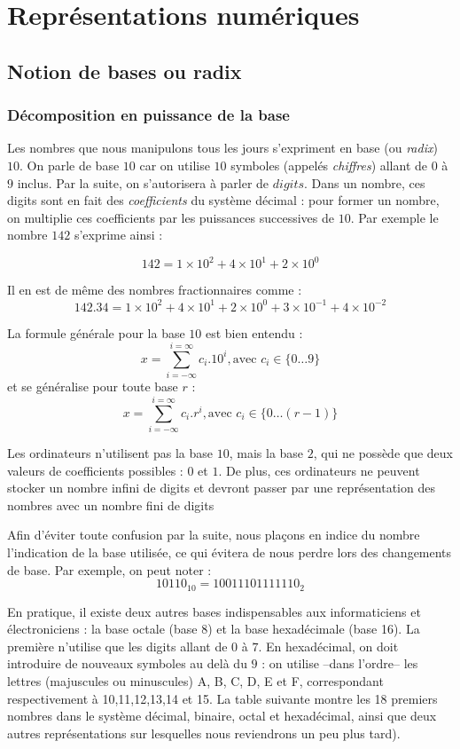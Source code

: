 \chapter{Représentations numériques}

\minitoc

\section{Notion de bases ou radix}

\subsection{Décomposition en puissance de la base}
Les nombres que nous manipulons tous les jours s'expriment en base (ou {\it radix}) $10$.
On parle de base $10$ car on utilise $10$ symboles (appelés {\it chiffres}) allant de $0$ à $9$ inclus.
Par la suite, on s'autorisera à parler de $digits$.
Dans un nombre, ces digits sont en fait des {\it coefficients} du système décimal :
pour former un nombre, on multiplie ces coefficients par les puissances successives de $10$.
Par exemple le nombre $142$ s'exprime ainsi :

$$ 142 = 1\times 10^2 + 4\times 10^1 + 2\times 10^0$$

Il en est de même des nombres fractionnaires comme :
$$ 142.34 = 1\times 10^2 + 4\times 10^1 + 2\times 10^0 + 3\times 10^{-1} + 4\times 10^{-2}$$

La formule générale pour la base $10$ est bien entendu :
$$ x = \sum_{i=-\infty}^{i=\infty} c_i.10^i, \mbox{avec } c_i \in \{0\dots 9\}$$
et se généralise pour toute base $r$ :
$$ x = \sum_{i=-\infty}^{i=\infty} c_i.r^i, \mbox{avec } c_i \in \{0\dots (r-1)\} $$

Les ordinateurs n'utilisent pas la base $10$, mais la base $2$, qui ne possède que deux valeurs de
coefficients possibles : $0$ et $1$. De plus, ces ordinateurs ne peuvent stocker un nombre infini de digits et devront passer par
une représentation des nombres avec un nombre fini de digits

Afin d'éviter toute confusion par la suite, nous plaçons en indice du nombre l'indication de la base utilisée,
ce qui évitera de nous perdre lors des changements de base. Par exemple, on peut noter :
$$10110_{10} = 10011101111110_2$$

En pratique, il existe deux autres bases indispensables aux informaticiens et électroniciens : la base octale (base 8) et la base
hexadécimale (base 16). La première n'utilise que les digits allant de $0$ à $7$. En hexadécimal, on doit introduire
de nouveaux symboles au delà du $9$ : on utilise --dans l'ordre-- les lettres (majuscules ou minuscules) A, B, C, D,
E et F, correspondant respectivement à 10,11,12,13,14 et 15. La table suivante montre les 18 premiers nombres dans
le système décimal, binaire, octal et hexadécimal, ainsi que deux autres représentations sur lesquelles nous
reviendrons un peu plus tard).\\


